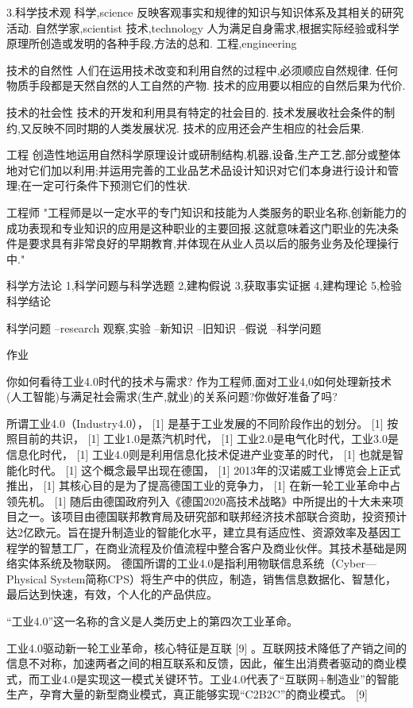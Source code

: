 \documentclass[a4paper]{book}
\numberwithin{equation}{chapter}
\theoremstyle{definition}
\begin{document}
	
3.科学技术观
科学,science
反映客观事实和规律的知识与知识体系及其相关的研究活动.
自然学家,scientist
技术,technology
人为满足自身需求,根据实际经验或科学原理所创造或发明的各种手段,方法的总和.
工程,engineering

技术的自然性
人们在运用技术改变和利用自然的过程中,必须顺应自然规律.
任何物质手段都是天然自然的人工自然的产物.
技术的应用要以相应的自然后果为代价.

技术的社会性
技术的开发和利用具有特定的社会目的.
技术发展收社会条件的制约,又反映不同时期的人类发展状况.
技术的应用还会产生相应的社会后果.

工程
创造性地运用自然科学原理设计或研制结构,机器,设备,生产工艺,部分或整体地对它们加以利用;并运用完善的工业品艺术品设计知识对它们本身进行设计和管理;在一定可行条件下预测它们的性状.

工程师
"工程师是以一定水平的专门知识和技能为人类服务的职业名称,创新能力的成功表现和专业知识的应用是这种职业的主要回报.这就意味着这门职业的先决条件是要求具有非常良好的早期教育,并体现在从业人员以后的服务业务及伦理操行中."


科学方法论
1,科学问题与科学选题
2,建构假说
3,获取事实证据
4,建构理论
5,检验科学结论

科学问题  --research  观察,实验
--新知识  --旧知识  --假说  --科学问题


\heiti 作业


你如何看待工业4.0时代的技术与需求?
作为工程师,面对工业4,0如何处理新技术(人工智能)与满足社会需求(生产,就业)的关系问题?你做好准备了吗?


所谓工业4.0（Industry4.0）， [1]  是基于工业发展的不同阶段作出的划分。 [1]  按照目前的共识， [1]  工业1.0是蒸汽机时代， [1]  工业2.0是电气化时代，工业3.0是信息化时代， [1]  工业4.0则是利用信息化技术促进产业变革的时代， [1]  也就是智能化时代。 [1] 
这个概念最早出现在德国， [1]  2013年的汉诺威工业博览会上正式推出， [1]  其核心目的是为了提高德国工业的竞争力， [1]  在新一轮工业革命中占领先机。 [1]  随后由德国政府列入《德国2020高技术战略》中所提出的十大未来项目之一。该项目由德国联邦教育局及研究部和联邦经济技术部联合资助，投资预计达2亿欧元。旨在提升制造业的智能化水平，建立具有适应性、资源效率及基因工程学的智慧工厂，在商业流程及价值流程中整合客户及商业伙伴。其技术基础是网络实体系统及物联网。
德国所谓的工业4.0是指利用物联信息系统（Cyber—Physical System简称CPS）将生产中的供应，制造，销售信息数据化、智慧化，最后达到快速，有效，个人化的产品供应。

“工业4.0”这一名称的含义是人类历史上的第四次工业革命。

工业4.0驱动新一轮工业革命，核心特征是互联 [9]  。互联网技术降低了产销之间的信息不对称，加速两者之间的相互联系和反馈，因此，催生出消费者驱动的商业模式，而工业4.0是实现这一模式关键环节。工业4.0代表了“互联网+制造业”的智能生产，孕育大量的新型商业模式，真正能够实现“C2B2C”的商业模式。 [9]
\end{document}
